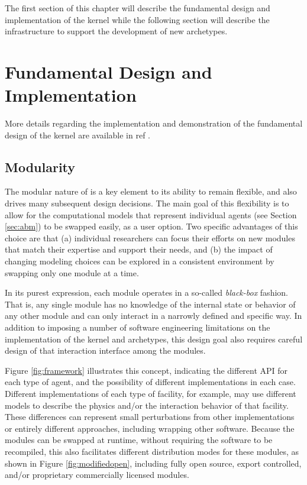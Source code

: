 The first section of this chapter will describe the fundamental design and
implementation of the \Cyclus kernel while the following section will describe
the infrastructure to support the development of new archetypes.

\section{Fundamental Design and Implementation} %

More details regarding the implementation and demonstration of the fundamental
design of the \Cyclus kernel are available in ref
.

\subsection{Modularity}

The modular nature of \Cyclus is a key element to its ability to remain
flexible, and also drives many subsequent design decisions.  The main goal of
this flexibility is to allow for the computational models that represent
individual agents (see Section \ref{sec:abm}) to be swapped easily, as a
user option.  Two specific advantages of this choice are that (a) individual
researchers can focus their efforts on new modules that match their expertise
and support their needs, and (b) the impact of changing modeling choices can
be explored in a consistent environment by swapping only one module at a time.

In its purest expression, each module operates in a so-called
\textit{black-box} fashion.  That is, any single module has no knowledge of
the internal state or behavior of any other module and can only interact in a
narrowly defined and specific way.  In addition to imposing a number of
software engineering limitations on the implementation of the kernel and
archetypes, this design goal also requires careful design of that interaction
interface among the modules.

Figure \ref{fig:framework} illustrates this concept, indicating the different
\gls{API} for each type of agent, and the possibility of different
implementations in each case.  Different implementations of each type of
facility, for example, may use different models to describe the physics and/or
the interaction behavior of that facility.  These differences can represent
small perturbations from other implementations or entirely different
approaches, including wrapping other software.  Because the modules can be
swapped at runtime, without requiring the software to be recompiled, this also
facilitates different distribution modes for these modules, as shown in Figure
\ref{fig:modifiedopen}, including fully open source, export controlled, and/or
proprietary commercially licensed modules.

